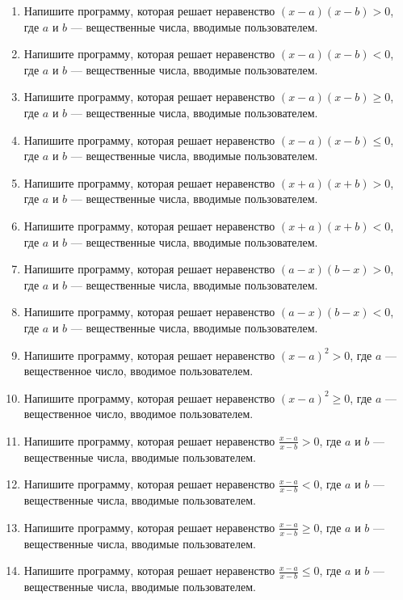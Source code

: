\documentclass[12pt]{article}
\begin{document}
\begin{enumerate}
    \item Напишите программу, которая решает неравенство $(x - a)(x - b) > 0$, где $a$ и $b$ — вещественные числа, вводимые пользователем.
    \item Напишите программу, которая решает неравенство $(x - a)(x - b) < 0$, где $a$ и $b$ — вещественные числа, вводимые пользователем.
    \item Напишите программу, которая решает неравенство $(x - a)(x - b) \geqslant 0$, где $a$ и $b$ — вещественные числа, вводимые пользователем.
    \item Напишите программу, которая решает неравенство $(x - a)(x - b) \leqslant 0$, где $a$ и $b$ — вещественные числа, вводимые пользователем.
    \item Напишите программу, которая решает неравенство $(x + a)(x + b) > 0$, где $a$ и $b$ — вещественные числа, вводимые пользователем.
    \item Напишите программу, которая решает неравенство $(x + a)(x + b) < 0$, где $a$ и $b$ — вещественные числа, вводимые пользователем.
    \item Напишите программу, которая решает неравенство $(a - x)(b - x) > 0$, где $a$ и $b$ — вещественные числа, вводимые пользователем.
    \item Напишите программу, которая решает неравенство $(a - x)(b - x) < 0$, где $a$ и $b$ — вещественные числа, вводимые пользователем.
    \item Напишите программу, которая решает неравенство $(x - a)^2 > 0$, где $a$ — вещественное число, вводимое пользователем.
    \item Напишите программу, которая решает неравенство $(x - a)^2 \geqslant 0$, где $a$ — вещественное число, вводимое пользователем.
    \item Напишите программу, которая решает неравенство $\frac{x - a}{x - b} > 0$, где $a$ и $b$ — вещественные числа, вводимые пользователем.
    \item Напишите программу, которая решает неравенство $\frac{x - a}{x - b} < 0$, где $a$ и $b$ — вещественные числа, вводимые пользователем.
    \item Напишите программу, которая решает неравенство $\frac{x - a}{x - b} \geqslant 0$, где $a$ и $b$ — вещественные числа, вводимые пользователем.
    \item Напишите программу, которая решает неравенство $\frac{x - a}{x - b} \leqslant 0$, где $a$ и $b$ — вещественные числа, вводимые пользователем.

\end{enumerate}
\end{document}
